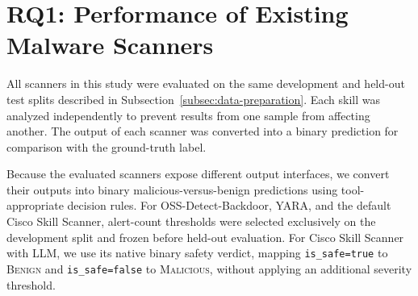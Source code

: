 


\section{RQ1: Performance of Existing Malware Scanners}

All scanners in this study were evaluated on the same development and held-out test splits described in Subsection~\ref{subsec:data-preparation}. Each skill was analyzed independently to prevent results from one sample from affecting another. The output of each scanner was converted into a binary prediction for comparison with the ground-truth label.

Because the evaluated scanners expose different output interfaces, we
convert their outputs into binary malicious-versus-benign predictions using
tool-appropriate decision rules. For OSS-Detect-Backdoor, YARA, and the
default Cisco Skill Scanner, alert-count thresholds were selected exclusively
on the development split and frozen before held-out evaluation. For Cisco Skill
Scanner with LLM, we use its native binary safety verdict, mapping
\texttt{is\_safe=true} to \textsc{Benign} and
\texttt{is\_safe=false} to \textsc{Malicious}, without applying an
additional severity threshold.

